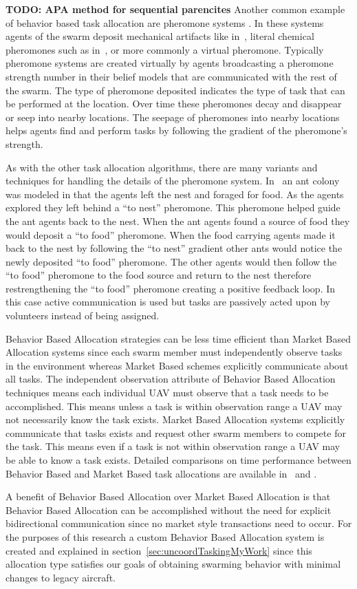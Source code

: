 \textbf{TODO: APA method for sequential parencites}
Another common example of behavior based task allocation are pheromone systems \parencite{p2p_pheromone} \parencite{manet_pheromone}.  In these systems agents of the swarm deposit mechanical artifacts like in~\textcite{beacon_pheromone}, literal chemical pheromones such as in~\textcite{ethanol_swarm}, or more commonly a virtual pheromone.  Typically pheromone systems are created virtually by agents broadcasting a pheromone strength number in their belief models that are communicated with the rest of the swarm. The type of pheromone deposited indicates the type of task that can be performed at the location.  Over time these pheromones decay and disappear or seep into nearby locations.  The seepage of pheromones into nearby locations helps agents find and perform tasks by following the gradient of the pheromone's strength.

As with the other task allocation algorithms, there are many variants and techniques for handling the details of the pheromone system.  In~\textcite{pheromone} an ant colony was modeled in that the agents left the nest and foraged for food.  As the agents explored they left behind a ``to nest'' pheromone.  This pheromone helped guide the ant agents back to the nest.  When the ant agents found a source of food they would deposit a ``to food'' pheromone.  When the food carrying agents made it back to the nest by following the ``to nest'' gradient other ants would notice the newly deposited ``to food'' pheromone.  The other agents would then follow the ``to food'' pheromone to the food source and return to the nest therefore restrengthening the ``to food'' pheromone creating a positive feedback loop.  In this case active communication is used but tasks are passively acted upon by volunteers instead of being assigned.

Behavior Based Allocation strategies can be less time efficient than Market Based Allocation systems since each swarm member must independently observe tasks in the environment whereas Market Based schemes explicitly communicate about all tasks.  The independent observation attribute of Behavior Based Allocation techniques means each individual UAV must observe that a task needs to be accomplished.  This means unless a task is within observation range a UAV may not necessarily know the task exists.  Market Based Allocation systems explicitly communicate that tasks exists and request other swarm members to compete for the task.  This means even if a task is not within observation range a UAV may be able to know a task exists.  Detailed comparisons on time performance between Behavior Based and Market Based task allocations are available in~\textcite{bba_vs_mba_1} and \textcite{bba_vs_mba_2}.

A benefit of Behavior Based Allocation over Market Based Allocation is that Behavior Based Allocation can be accomplished without the need for explicit bidirectional communication since no market style transactions need to occur.  For the purposes of this research a custom Behavior Based Allocation system is created and explained in section~\ref{sec:uncoordTaskingMyWork} since this allocation type satisfies our goals of obtaining swarming behavior with minimal changes to legacy aircraft.